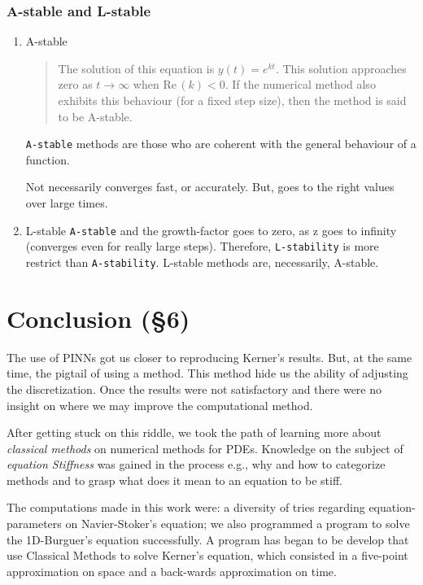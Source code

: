 \documentclass[11pt]{article}
\begin{document}
\subsubsection{A-stable and L-stable}
\label{sec:org32c6307}
\begin{enumerate}
\item A-stable
\label{sec:org46b86b8}

\begin{quote}
The solution of this equation is \(y(t) = e^{kt}\). This solution
approaches zero as \(t\to \infty\)  when  \(\mathrm {Re} \,(k)<0\). If the
numerical method also exhibits this behaviour (for a fixed step size),
then the method is said to be A-stable.
\end{quote}

\texttt{A-stable} methods are those who are coherent with the general
behaviour of a function.

Not necessarily converges fast, or accurately. But, goes to the right
values over large times.

\item L-stable
\label{sec:org2ea34a4}
\texttt{A-stable} and the growth-factor goes to zero, as z goes to infinity
(converges even for really large steps). Therefore, \texttt{L-stability} is more
restrict than \texttt{A-stability}. L-stable methods are, necessarily, A-stable.
\end{enumerate}

\section{Conclusion (§6)}
\label{sec:orgfaa285c}
The use of PINNs got us closer to reproducing Kerner's
results. But, at the same time, the pigtail of using a method. This method
hide us the ability of adjusting the discretization. Once the results were not
satisfactory and there were no insight on where we may improve the computational
method.

After getting stuck on this riddle, we took the path of learning more
about \emph{classical methods} on numerical methods for PDEs. Knowledge on
the subject of \emph{equation Stiffness} was gained in the process e.g., why
and how to categorize methods and to grasp what does it mean to an
equation to be stiff.

The computations made in this work were: a diversity of tries regarding equation-parameters on
Navier-Stoker's equation; we also programmed a program to solve the 1D-Burguer's
equation successfully. A program has began to be develop that use Classical
Methods to solve Kerner's equation, which consisted in a five-point
approximation on space and a back-wards approximation on time.


\end{document}
